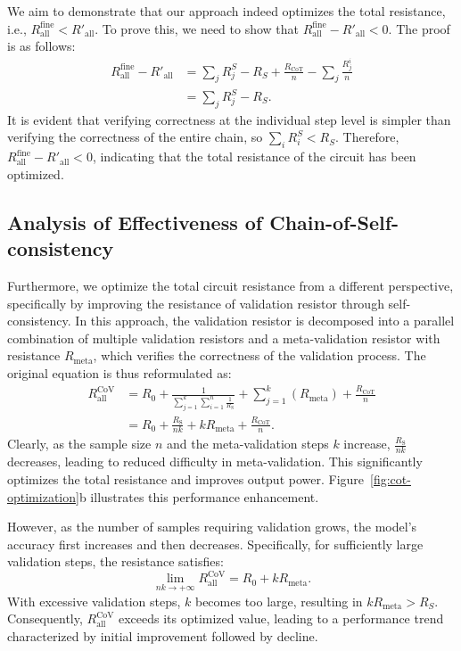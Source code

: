 We aim to demonstrate that our approach indeed optimizes the total resistance, i.e., $ R^{\text{fine}}_{\text{all}} < R'_{\text{all}} $. To prove this, we need to show that $ R^{\text{fine}}_{\text{all}} - R'_{\text{all}} < 0 $. The proof is as follows:
\begin{align}
    R^{\text{fine}}_{\text{all}} - R'_{\text{all}} &= \sum_j R_j^S - R_S + \frac{R_{\text{CoT}}}{n} - \sum_j\frac{R_j^{i}}{n}\\
    &= \sum_j R_j^S - R_S.
\end{align}
It is evident that verifying correctness at the individual step level is simpler than verifying the correctness of the entire chain, so $ \sum_i R_i^S < R_S $. Therefore, $ R^{\text{fine}}_{\text{all}} - R'_{\text{all}} < 0 $, indicating that the total resistance of the circuit has been optimized.


\subsection{Analysis of Effectiveness of Chain-of-Self-consistency}\label{append:proof-chain}
Furthermore, we optimize the total circuit resistance from a different perspective, specifically by improving the resistance of validation resistor through self-consistency. In this approach, the validation resistor is decomposed into a parallel combination of multiple validation resistors and a meta-validation resistor with resistance $R_{\text{meta}}$, which verifies the correctness of the validation process. The original equation is thus reformulated as:
\begin{align*}
R^{\text{CoV}}_{\text{all}} &= R_0 +\frac{1}{\sum_{j=1}^k\sum_{i=1}^n \frac{1}{R_{\text{S}}}} + \sum_{j=1}^k\left(R_{\text{meta}}\right) + \frac{R_{\text{CoT}}}{n}\\
&= R_0 + \frac{R_{\text{S}}}{nk} + k R_{\text{meta}} + \frac{R_{\text{CoT}}}{n}.
\end{align*}
Clearly, as the sample size $n$ and the meta-validation steps $k$ increase, $\frac{R_{\text{S}}}{nk}$ decreases, leading to reduced difficulty in meta-validation. This significantly optimizes the total resistance and improves output power. Figure~\ref{fig:cot-optimization}b illustrates this performance enhancement.

However, as the number of samples requiring validation grows, the model's accuracy first increases and then decreases. Specifically, for sufficiently large validation steps, the resistance satisfies:
\begin{equation}
    \lim_{nk \to +\infty} R^{\text{CoV}}_{\text{all}} = R_0 + k R_{\text{meta}}.
\end{equation}
With excessive validation steps, $k$ becomes too large, resulting in $k R_{\text{meta}} > R_S$. Consequently, $R^{\text{CoV}}_{\text{all}}$ exceeds its optimized value, leading to a performance trend characterized by initial improvement followed by decline.

